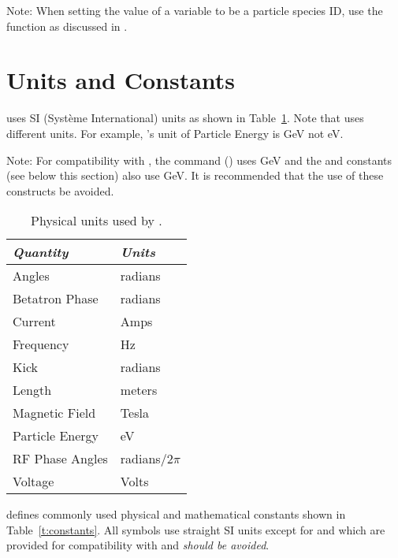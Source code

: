 {{{{{Note: When setting the value of a variable to be a particle species ID, use the  function as discussed
in .

\newpage

\section{Units and Constants}
\label{s:constants}

\bmad uses SI (Syst\`eme International) units as shown in Table~\ref{t:units}.  Note that \mad uses
different units. For example, \mad's unit of Particle Energy is GeV not eV. 

Note: For compatibility with \mad, the  command () uses GeV
and the  and  constants (see below this section) also use GeV. It is recommended that
the use of these constructs be avoided.

\begin{table}[ht]
\centering
\begin{tabular}{ll} \toprule
  {\em Quantity}     & {\em Units}       \\ \midrule
  Angles             &    radians        \\ 
  Betatron Phase     &    radians        \\
  Current            &    Amps           \\ 
  Frequency          &    Hz             \\ 
  Kick               &    radians        \\ 
  Length             &    meters         \\ 
  Magnetic Field     &    Tesla          \\ 
  Particle Energy    &    eV             \\ 
  RF Phase Angles    &    radians/2$\pi$ \\ 
  Voltage            &    Volts          \\ \bottomrule
\end{tabular}
\caption{Physical units used by \bmad.}
\label{t:units}
\end{table}

\bmad defines commonly used physical and mathematical constants shown in Table~\ref{t:constants}.
All symbols use straight SI units except for  and  which are provided for
compatibility with \mad and {\large\em should be avoided}.

}}}}}
